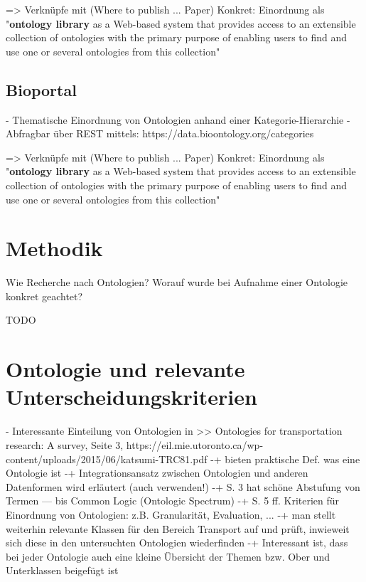\documentclass{article}
\begin{document}
=> Verknüpfe mit (Where to publish ... Paper) \cite{d2012publish}
Konkret: Einordnung als "\textbf{ontology library} as a Web-based system that provides access to an
extensible collection of ontologies with the primary purpose of enabling users to find and
use one or several ontologies from this collection"



\subsection{Bioportal}

- Thematische Einordnung von Ontologien anhand einer Kategorie-Hierarchie
  - Abfragbar über REST mittels: https://data.bioontology.org/categories

=> Verknüpfe mit (Where to publish ... Paper) \cite{d2012publish}
Konkret: Einordnung als "\textbf{ontology library} as a Web-based system that provides access to an
extensible collection of ontologies with the primary purpose of enabling users to find and
use one or several ontologies from this collection"


\section{Methodik}

Wie Recherche nach Ontologien?
Worauf wurde bei Aufnahme einer Ontologie konkret geachtet?

TODO


\section{Ontologie und relevante Unterscheidungskriterien}

- Interessante Einteilung von Ontologien in >> Ontologies for transportation research: A survey, Seite 3, https://eil.mie.utoronto.ca/wp-content/uploads/2015/06/katsumi-TRC81.pdf
-+ bieten praktische Def. was eine Ontologie ist
-+ Integrationsansatz zwischen Ontologien und anderen Datenformen wird erläutert (auch verwenden!)
-+ S. 3 hat schöne Abstufung von Termen --- bis Common Logic (Ontologic Spectrum)
-+ S. 5 ff. Kriterien für Einordnung von Ontologien: z.B. Granularität, Evaluation, ...
-+ man stellt weiterhin relevante Klassen für den Bereich Transport auf und prüft, inwieweit sich diese in den untersuchten Ontologien wiederfinden
-+ Interessant ist, dass bei jeder Ontologie auch eine kleine Übersicht der Themen bzw. Ober und Unterklassen beigefügt ist
\end{document}
